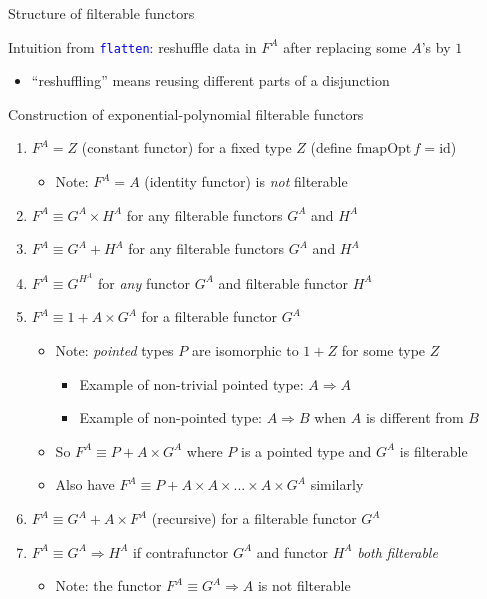 \documentclass[english]{beamer}
\begin{document}
\begin{frame}{Structure of filterable functors}

Intuition from \texttt{\textcolor{blue}{\footnotesize{}flatten}}:
reshuffle data in $F^{A}$ after replacing some $A$'s by $1$
\begin{itemize}
\item ``reshuffling'' means reusing different parts of a disjunction
\end{itemize}
Construction of exponential-polynomial filterable functors 
\begin{enumerate}
\item $F^{A}=Z$ (constant functor) for a fixed type $Z$ (define $\text{fmapOpt}\,f=\text{id}$)
\begin{itemize}
\item Note: $F^{A}=A$ (identity functor) is \emph{not} filterable
\end{itemize}
\item $F^{A}\equiv G^{A}\times H^{A}$ for any filterable functors $G^{A}$
and $H^{A}$
\item $F^{A}\equiv G^{A}+H^{A}$ for any filterable functors $G^{A}$ and
$H^{A}$
\item $F^{A}\equiv G^{H^{A}}$ for \emph{any} functor $G^{A}$ and filterable
functor $H^{A}$
\item $F^{A}\equiv1+A\times G^{A}$ for a filterable functor $G^{A}$
\begin{itemize}
\item Note: \emph{pointed} types $P$ are isomorphic to $1+Z$ for some
type $Z$
\begin{itemize}
\item Example of non-trivial pointed type: $A\Rightarrow A$
\item Example of non-pointed type: $A\Rightarrow B$ when $A$ is different
from $B$
\end{itemize}
\item So $F^{A}\equiv P+A\times G^{A}$ where $P$ is a pointed type and
$G^{A}$ is filterable
\item Also have $F^{A}\equiv P+A\times A\times...\times A\times G^{A}$
similarly
\end{itemize}
\item $F^{A}\equiv G^{A}+A\times F^{A}$ (recursive) for a filterable functor
$G^{A}$
\item $F^{A}\equiv G^{A}\Rightarrow H^{A}$ if\emph{ }contrafunctor $G^{A}$
and functor $H^{A}$ \emph{both} \emph{filterable}
\begin{itemize}
\item Note: the functor $F^{A}\equiv G^{A}\Rightarrow A$ is not filterable
\end{itemize}
\end{enumerate}
\end{frame}
\end{document}
